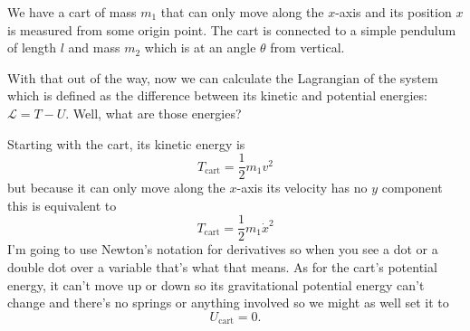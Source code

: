 \documentclass{article}
\begin{document}
We have a cart of mass $m_1$ that can only move along the $x$-axis and its position $x$ is measured from some origin point. The cart is connected to a simple pendulum of length $l$ and mass $m_2$ which is at an angle $\theta$ from vertical.

With that out of the way, now we can calculate the Lagrangian of the system which is defined as the difference between its kinetic and potential energies: $\mathcal{L} = T - U$. Well, what are those energies?

Starting with the cart, its kinetic energy is \[T_\text{cart} = \frac{1}{2} m_1 v^2\] but because it can only move along the $x$-axis its velocity has no $y$ component this is equivalent to \[T_\text{cart} = \frac{1}{2} m_1 \dot{x}^2\] I'm going to use Newton's notation for derivatives so when you see a dot or a double dot over a variable that's what that means. As for the cart's potential energy, it can't move up or down so its gravitational potential energy can't change and there's no springs or anything involved so we might as well set it to \[U_\text{cart} = 0.\]
\end{document}
